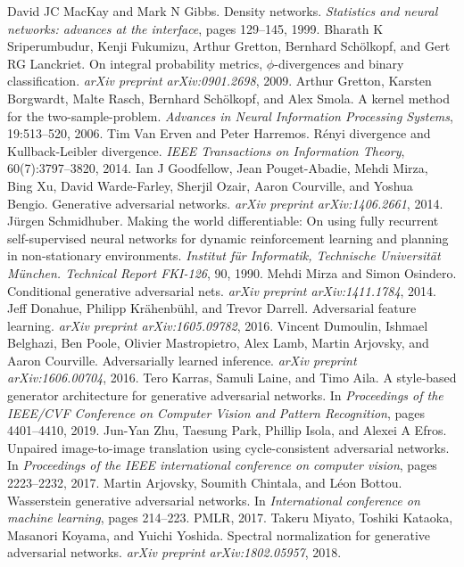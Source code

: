 \begin{chapterreferences}
 David JC MacKay and Mark N Gibbs. Density networks. \emph{Statistics and neural networks: advances at the interface}, pages 129–145, 1999.
 Bharath K Sriperumbudur, Kenji Fukumizu, Arthur Gretton, Bernhard Schölkopf, and Gert RG Lanckriet. On integral probability metrics, $\phi$-divergences and binary classification. \emph{arXiv preprint arXiv:0901.2698}, 2009.
 Arthur Gretton, Karsten Borgwardt, Malte Rasch, Bernhard Schölkopf, and Alex Smola. A kernel method for the two-sample-problem. \emph{Advances in Neural Information Processing Systems}, 19:513–520, 2006.
 Tim Van Erven and Peter Harremos. Rényi divergence and Kullback-Leibler divergence. \emph{IEEE Transactions on Information Theory}, 60(7):3797–3820, 2014.
 Ian J Goodfellow, Jean Pouget-Abadie, Mehdi Mirza, Bing Xu, David Warde-Farley, Sherjil Ozair, Aaron Courville, and Yoshua Bengio. Generative adversarial networks. \emph{arXiv preprint arXiv:1406.2661}, 2014.
 Jürgen Schmidhuber. Making the world differentiable: On using fully recurrent self-supervised neural networks for dynamic reinforcement learning and planning in non-stationary environments. \emph{Institut für Informatik, Technische Universität München. Technical Report FKI-126}, 90, 1990.
 Mehdi Mirza and Simon Osindero. Conditional generative adversarial nets. \emph{arXiv preprint arXiv:1411.1784}, 2014.
 Jeff Donahue, Philipp Krähenbühl, and Trevor Darrell. Adversarial feature learning. \emph{arXiv preprint arXiv:1605.09782}, 2016.
 Vincent Dumoulin, Ishmael Belghazi, Ben Poole, Olivier Mastropietro, Alex Lamb, Martin Arjovsky, and Aaron Courville. Adversarially learned inference. \emph{arXiv preprint arXiv:1606.00704}, 2016.
 Tero Karras, Samuli Laine, and Timo Aila. A style-based generator architecture for generative adversarial networks. In \emph{Proceedings of the IEEE/CVF Conference on Computer Vision and Pattern Recognition}, pages 4401–4410, 2019.
 Jun-Yan Zhu, Taesung Park, Phillip Isola, and Alexei A Efros. Unpaired image-to-image translation using cycle-consistent adversarial networks. In \emph{Proceedings of the IEEE international conference on computer vision}, pages 2223–2232, 2017.
 Martin Arjovsky, Soumith Chintala, and Léon Bottou. Wasserstein generative adversarial networks. In \emph{International conference on machine learning}, pages 214–223. PMLR, 2017.
 Takeru Miyato, Toshiki Kataoka, Masanori Koyama, and Yuichi Yoshida. Spectral normalization for generative adversarial networks. \emph{arXiv preprint arXiv:1802.05957}, 2018.

\end{chapterreferences}
